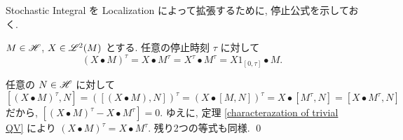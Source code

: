\documentclass{ltjsarticle}
\begin{document}
Stochastic Integral を Localization によって拡張するために, 停止公式を示しておく.
\begin{prp}
	\( M \in \mathscr{H} \), \( X \in \mathscr{L}^2 (M) \) とする.
	任意の停止時刻 \( \tau \) に対して
	\[
		(X \bullet M)^{ \tau }	= X \bullet M^{ \tau } = X^{ \tau } \bullet M^{ \tau }
		= X1_{ [0,\tau] } \bullet M.
	\]
\end{prp}

\begin{prf}
	任意の \( N \in \mathscr{H} \) に対して
	\[
		\left[ (X \bullet M)^{ \tau },N \right]
		= \left( \left[ (X \bullet M),N \right] \right)^{ \tau }
		= \left( X \bullet [ M,N ] \right)^{ \tau }
		= X \bullet \left[ M^{ \tau },N \right]
		= [ X \bullet M^{ \tau },N ]
	\]
	だから, \( [ (X \bullet M)^{ \tau } - X \bullet M^{ \tau } ] = 0 \).
	ゆえに, 定理 \ref{characterazation of trivial QV} により \( (X \bullet M)^{ \tau } = X \bullet M^{ \tau } \).
	残り2つの等式も同様.
	\qed\end{prf}
\end{document}
